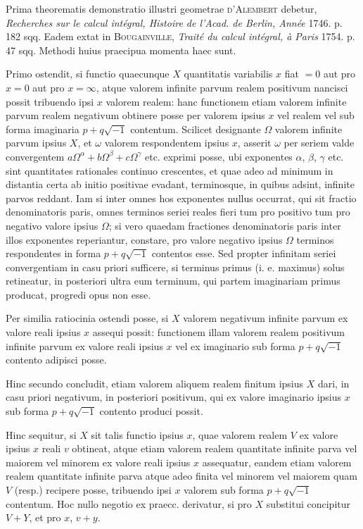 Prima theorematis demonstratio illustri geometrae \textsc{d'Alembert} debetur, \textit{Recherches sur le calcul intégral, Histoire de l'Acad. de Berlin, Année} 1746.
p. 182 sqq. Eadem extat in \textsc{Bougainville}, \textit{Traité du calcul intégral, à Paris} 1754.
p. 47 sqq. Methodi huius praecipua momenta haec sunt.

Primo ostendit, si functio quaecunque $X$ quantitatis variabilis $x$ fiat $=0$
aut pro $x=0$ aut pro $x=\infty$, atque valorem infinite parvum realem positivum nancisci possit tribuendo ipsi $x$ valorem realem: hanc functionem etiam valorem infinite parvum realem negativum obtinere posse per valorem ipsius $x$ vel
realem vel sub forma imaginaria $p+q\sqrt{-1}$ contentum. Scilicet designante $\Omega$
valorem infinite parvum ipsius $X$, et $\omega$ valorem respondentem ipsius $x$, asserit
$\omega$ per seriem valde convergentem $a\Omega^\alpha+b\Omega^\beta+c\Omega^\gamma$ etc. exprimi posse, ubi exponentes $\alpha$, $\beta$, $\gamma$ etc. sint quantitates rationales continuo crescentes, et quae adeo
ad minimum in distantia certa ab initio positivae evadant, terminosque, in quibus adsint, infinite parvos reddant. Iam si inter omnes hos exponentes nullus
occurrat, qui sit fractio denominatoris paris, omnes terminos seriei reales fieri tum
pro positivo tum pro negativo valore ipsius $\Omega$; si vero quaedam fractiones denominatoris paris inter illos exponentes reperiantur, constare, pro valore negativo
ipsius $\Omega$ terminos respondentes in forma $p+q\sqrt{-1}$ contentos esse. Sed propter infinitam seriei convergentiam in casu priori sufficere, si terminus primus (i. e.
maximus) solus retineatur, in posteriori ultra eum terminum, qui partem imaginariam primus producat, progredi opus non esse.

Per similia ratiocinia ostendi posse, si $X$ valorem negativum infinite parvum ex valore reali ipsius $x$ assequi possit: functionem illam valorem realem
positivum infinite parvum ex valore reali ipsius $x$ vel ex imaginario sub forma
$p+q\sqrt{-1}$ contento adipisci posse.

Hinc secundo concludit, etiam valorem aliquem realem finitum ipsius $X$
dari, in casu priori negativum, in posteriori positivum, qui ex valore imaginario
ipsius $x$ sub forma $p+q\sqrt{-1}$ contento produci possit.

Hinc sequitur, si $X$ sit talis functio ipsius $x$, quae valorem realem $V$
ex valore ipsius $x$ reali $v$ obtineat, atque etiam valorem realem quantitate infinite parva vel maiorem vel minorem ex valore reali ipsius $x$ assequatur, eandem
etiam valorem realem quantitate infinite parva atque adeo finita vel minorem vel
maiorem quam $V$ (resp.) recipere posse, tribuendo ipsi $x$ valorem sub forma
$p+q\sqrt{-1}$ contentum. Hoc nullo negotio ex praecc. derivatur, si pro $X$ substitui concipitur $V+Y$, et pro $x$, $v+y$.

